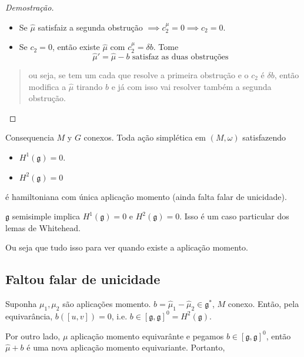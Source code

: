 \begin{proof}[Demostração]
	\begin{itemize}
	\item Se $\hat{\mu}$ satisfaiz a segunda obstrução $\implies c_2^\mu=0\implies c_2=0$.
	
		\item Se $c_2=0$, então existe  $\hat{\mu}$ com $c_2^\mu=\delta b$. Tome
			\[\hat{\mu}'=\hat{\mu}-b\text{ satisfaz as duas obstruções} \]
	\end{itemize}
	{\color{3}\begin{quotation}
		ou seja, se tem um cada que resolve a primeira obstrução e o $c_2$ é $\delta b$, então modifica a $\hat{\mu}$ tirando $b$ e já com isso vai resolver também a segunda obstrução.
	\end{quotation}}
\end{proof}

\begin{thing5}{Consequencia}\leavevmode
	$M$ y $G$ conexos. Toda ação simplética em $(M,\omega)$ satisfazendo
	\begin{itemize}
	\item $H^{1}(\mathfrak{g})=0$.
	\item $H^{2}(\mathfrak{g})=0$
	\end{itemize}
é hamiltoniana {\color{3}com única aplicação momento (ainda falta falar de unicidade)}.
\end{thing5}

\begin{remark}\leavevmode
	$\mathfrak{g}$ semisimple implica $H^{1}(\mathfrak{g})=0$ e $H^{2}(\mathfrak{g})=0$. Isso é um caso particular dos lemas de Whitehead.
\end{remark}

Ou seja que tudo isso para ver quando existe a aplicação momento.

\subsection{Faltou falar de unicidade}

Suponha $\mu_1,\mu_2$ são aplicações  momento. $b=\hat{\mu}_1-\hat{\mu}_2\in\mathfrak{g}^*$, $M$ conexo. Então, pela equivarância, $b([u,v])=0$, i.e. $b\in [\mathfrak{g},\mathfrak{g} ]^0=H^{2}(\mathfrak{g})$.

Por outro lado, $\mu$ aplicação momento equivarânte e pegamos $b\in [\mathfrak{g},\mathfrak{g} ]^0$, então $\hat{\mu}+b$ é uma nova aplicação momento equivariante. Portanto,

